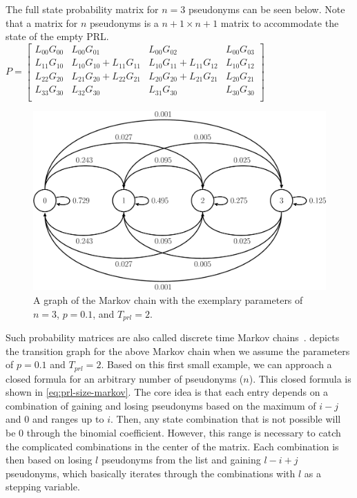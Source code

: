 The full state probability matrix for $n=3$ pseudonyms can be seen below. Note
that a matrix for $n$ pseudonyms is a $n+1 \times n+1$ matrix to accommodate the
state of the empty \ac{PRL}.\vspace{2mm}\\
\begin{math}
    P =
    \left[ {\begin{smallmatrix}{}
      L_{00}G_{00} & L_{00}G_{01} & L_{00}G_{02} & L_{00}G_{03} \\
      L_{11}G_{10} & L_{10}G_{10} + L_{11}G_{11} & L_{10}G_{11} + L_{11}G_{12} & L_{10}G_{12} \\
      L_{22}G_{20} & L_{21}G_{20} + L_{22}G_{21} & L_{20}G_{20} + L_{21}G_{21} & L_{20}G_{21} \\
      L_{33}G_{30} & L_{32}G_{30} & L_{31}G_{30} & L_{30}G_{30} \\
    \end{smallmatrix} } \right]
\end{math}
\vspace{2mm}

\begin{figure}
    \centering
    \includegraphics[width=.85\columnwidth]{figures/markov-tikzplot/small-tikz.pdf}
    \caption{A graph of the Markov chain with the exemplary parameters of $n=3$, $p=0.1$, and $T_{prl}=2$.}
    \label{fig:appendix:markov-graph}
\end{figure}

Such probability matrices are also called discrete time Markov
chains~\cite{hermanns2002markov}.  depicts the
transition graph for the above Markov chain when we assume the parameters of
$p=0.1$ and $T_{prl}=2$. Based on this first small example, we can approach a
closed formula for an arbitrary number of pseudonyms ($n$). This closed formula
is shown in \cref{eq:prl-size-markov}. The core idea is that each entry depends
on a combination of gaining and losing pseudonyms based on the maximum of $i-j$
and $0$ and ranges up to $i$. Then, any state combination that is not possible
will be $0$ through the binomial coefficient. However, this range is necessary
to catch the complicated combinations in the center of the matrix. Each
combination is then based on losing $l$ pseudonyms from the list and gaining
$l-i+j$ pseudonyms, which basically iterates through the combinations with $l$
as a stepping variable.

